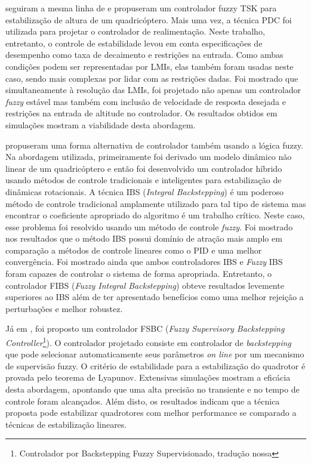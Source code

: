  seguiram a mesma linha de  e propuseram um controlador fuzzy TSK para estabilização de altura de um quadricóptero. Mais uma vez, a técnica PDC foi utilizada para projetar o controlador de realimentação. Neste trabalho, entretanto, o controle de estabilidade levou em conta especificações de desempenho como taxa de decaimento e restrições na entrada. Como ambas condições podem ser representadas por LMIs, elas também foram usadas neste caso, sendo mais complexas por lidar com as restrições dadas. Foi mostrado que simultaneamente à resolução das LMIs, foi projetado não apenas um controlador \textit{fuzzy} estável mas também com inclusão de velocidade de resposta desejada e restrições na entrada de altitude no controlador. Os resultados obtidos em simulações mostram a viabilidade desta abordagem.

 propuseram uma forma alternativa de controlador também usando a lógica fuzzy. Na abordagem utilizada, primeiramente foi derivado um modelo dinâmico não linear de um quadricóptero e então foi desenvolvido um controlador híbrido usando métodos de controle tradicionais e inteligentes para estabilização de dinâmicas rotacionais. A técnica IBS (\textit{Integral Backstepping}) é um poderoso método de controle tradicional amplamente utilizado para tal tipo de sistema mas encontrar o coeficiente apropriado do algoritmo é um trabalho crítico. Neste caso, esse problema foi resolvido usando um método de controle \textit{fuzzy}. Foi mostrado nos resultados que o método IBS possui domínio de atração mais amplo em comparação a métodos de controle lineares como o PID e uma melhor convergência. Foi mostrado ainda que ambos controladores IBS e \textit{Fuzzy} IBS foram capazes de controlar o sistema de forma apropriada. Entretanto, o controlador FIBS (\textit{Fuzzy Integral Backstepping}) obteve resultados levemente superiores ao IBS além de ter apresentado benefícios como uma melhor rejeição a perturbações e melhor robustez.

Já em \cite{Ariffanan2014}, foi proposto um controlador FSBC (\textit{Fuzzy Supervisory Backstepping Controller}\footnote{Controlador por Backstepping Fuzzy Supervisionado, tradução nossa}). O controlador projetado consiste em controlador de \textit{backstepping} que pode selecionar automaticamente seus parâmetros \textit{on line} por um mecanismo de supervisão fuzzy. O critério de estabilidade para a estabilização do quadrotor é provada pelo teorema de Lyapunov. Extensivas simulações mostram a eficácia desta abordagem, apontando que uma alta precisão no transiente e no tempo de controle foram alcançados. Além disto, os resultados indicam que a técnica proposta pode estabilizar quadrotores com melhor performance se comparado a técnicas de estabilização lineares.

